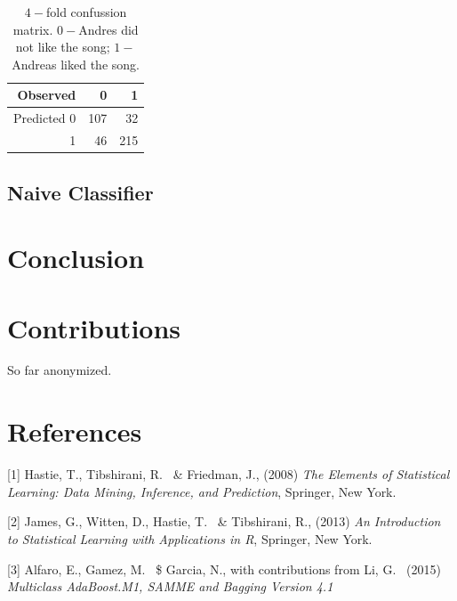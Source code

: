 \documentclass{article}
\begin{document}
\begin {table}[h]
\caption {$4-$fold confussion matrix. $0-$Andres did not like the song; $1-$Andreas liked the song.} \label{tab:confussion_matrix} 
\begin{center}
\begin{tabular}{r|r|r}
\hline
  Observed & 0  & 1 \\
  \hline			
  Predicted 0 & 107 & 32 \\
  1 & 46 & 215 \\ 
  \hline
\end{tabular}
\end{center}
\end {table}

\subsection{Naive Classifier}

\section{Conclusion}

\section{Contributions}

So far anonymized.

\section*{References}

\small

[1] Hastie, T., Tibshirani, R. \ \& Friedman, J., (2008) {\it The Elements of Statistical Learning: Data Mining, Inference, and Prediction}, Springer, New York.

[2] James, G., Witten, D., Hastie, T. \ \& Tibshirani, R., (2013) {\it An Introduction to Statistical Learning
with Applications in R}, Springer, New York.

[3] Alfaro, E., Gamez, M. \ \$ Garcia, N., with contributions from Li, G. \ (2015) {\it Multiclass AdaBoost.M1, SAMME and Bagging Version 4.1}
\end{document}
